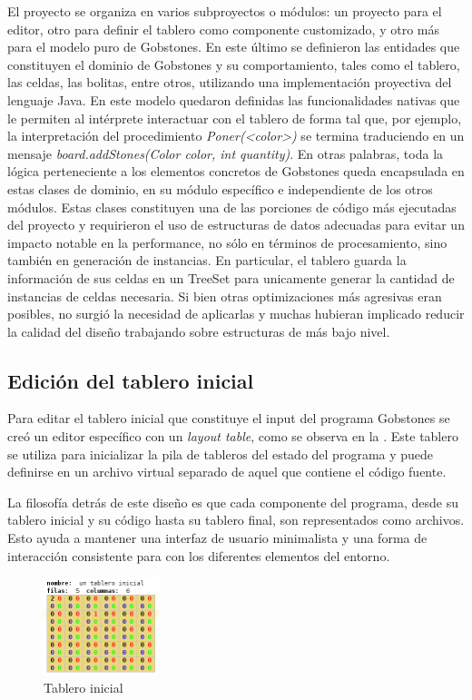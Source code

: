 El proyecto se organiza en varios subproyectos o módulos: un proyecto para el editor, otro para definir el tablero como componente customizado, y otro más para el modelo puro de Gobstones. En este último se definieron las entidades que constituyen el dominio de Gobstones y su comportamiento, tales como el tablero, las celdas, las bolitas, entre otros, utilizando una implementación proyectiva del lenguaje Java. En este modelo quedaron definidas las funcionalidades nativas que le permiten al intérprete interactuar con el tablero de forma tal que, por ejemplo, la interpretación del procedimiento \textit{Poner(<color>)} se termina traduciendo en un mensaje \textit{board.addStones(Color color, int quantity)}. En otras palabras, toda la lógica perteneciente a los elementos concretos de Gobstones queda encapsulada en estas clases de dominio, en su módulo específico e independiente de los otros módulos.
Estas clases constituyen una de las porciones de código más ejecutadas del proyecto y requirieron el uso de estructuras de datos adecuadas para evitar un impacto notable en la performance, no sólo en términos de procesamiento, sino también en generación de instancias. En particular, el tablero guarda la información de sus celdas en un TreeSet  para unicamente generar la cantidad de instancias de celdas necesaria. Si bien otras optimizaciones más agresivas eran posibles, no surgió la necesidad de aplicarlas y muchas hubieran implicado reducir la calidad del diseño trabajando sobre estructuras de más bajo nivel.

\subsection{Edición del tablero inicial}

Para editar el tablero inicial que constituye el input del programa Gobstones se creó un editor específico con un \textit{layout table}, como se observa en la . Este tablero se utiliza para inicializar la pila de tableros del estado del programa y puede definirse en un archivo virtual separado de aquel que contiene el código fuente. 

La filosofía detrás de este diseño es que cada componente del programa, desde su tablero inicial y su código hasta su tablero final, son representados como archivos. Esto ayuda a mantener una interfaz de usuario minimalista y una forma de interacción consistente para con los diferentes elementos del entorno.

\begin{figure}[hb]
\centering
\includegraphics[width=0.3\textwidth]{assets/initial_board}
\caption{Tablero inicial}
\label{fig:initial_board}
\end{figure}


